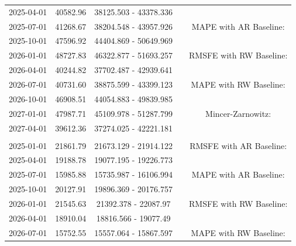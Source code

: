 \begin{table}
\begin{tabular}[t]{ccccc}
\hspace{1em}2025-04-01 & 40582.96 & 38125.503 - 43378.336 &  & \\
\hspace{1em}2025-07-01 & 41268.67 & 38204.548 - 43957.926 &  & MAPE with AR Baseline:\\
\hspace{1em}2025-10-01 & 47596.92 & 44404.869 - 50649.969 &  & \\
\hspace{1em}2026-01-01 & 48727.83 & 46322.877 - 51693.257 &  & RMSFE with RW Baseline:\\
\hspace{1em}2026-04-01 & 40244.82 & 37702.487 - 42939.641 &  & \\
\hspace{1em}2026-07-01 & 40731.60 & 38875.599 - 43399.123 &  & MAPE with RW Baseline:\\
\hspace{1em}2026-10-01 & 46908.51 & 44054.883 - 49839.985 &  & \\
\hspace{1em}2027-01-01 & 47987.71 & 45109.978 - 51287.799 &  & Mincer-Zarnowitz:\\
\hspace{1em}2027-04-01 & 39612.36 & 37274.025 - 42221.181 &  & \\
\addlinespace[0.3em]
\multicolumn{5}{l}{\textbf{EmiCO2ManInd}}\\
\hspace{1em}2025-01-01 & 21861.79 & 21673.129 - 21914.122 &  & RMSFE with AR Baseline:\\
\hspace{1em}2025-04-01 & 19188.78 & 19077.195 - 19226.773 &  & \\
\hspace{1em}2025-07-01 & 15985.88 & 15735.987 - 16106.994 &  & MAPE with AR Baseline:\\
\hspace{1em}2025-10-01 & 20127.91 & 19896.369 - 20176.757 &  & \\
\hspace{1em}2026-01-01 & 21545.63 & 21392.378 - 22087.97 &  & RMSFE with RW Baseline:\\
\hspace{1em}2026-04-01 & 18910.04 & 18816.566 - 19077.49 &  & \\
\hspace{1em}2026-07-01 & 15752.55 & 15557.064 - 15867.597 &  & MAPE with RW Baseline:\\

\end{tabular}
\end{table}
